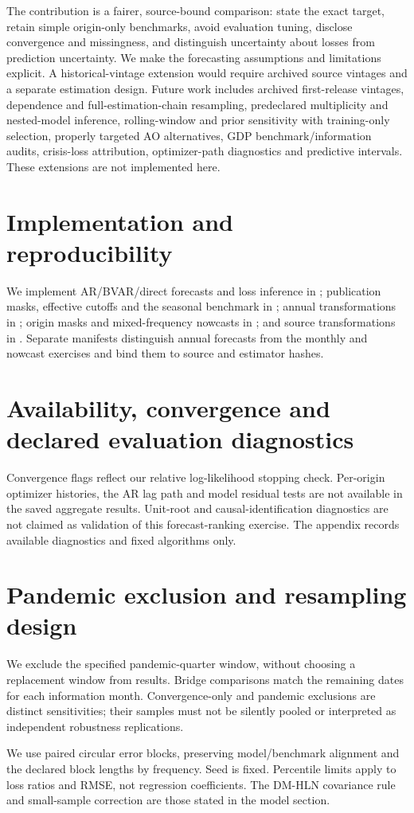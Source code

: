 The contribution is a fairer, source-bound comparison: state the exact target, retain simple origin-only benchmarks, avoid evaluation tuning, disclose convergence and missingness, and distinguish uncertainty about losses from prediction uncertainty. We make the forecasting assumptions and limitations explicit. A historical-vintage extension would require archived source vintages and a separate estimation design.
Future work includes archived first-release vintages, dependence and full-estimation-chain resampling, predeclared multiplicity and nested-model inference, rolling-window and prior sensitivity with training-only selection, properly targeted AO alternatives, GDP benchmark/information audits, crisis-loss attribution, optimizer-path diagnostics and predictive intervals. These extensions are not implemented here.

\clearpage
\appendix
\begingroup\small
\section{Implementation and reproducibility}
We implement AR/BVAR/direct forecasts and loss inference in ; publication masks, effective cutoffs and the seasonal benchmark in ; annual transformations in ; origin masks and mixed-frequency nowcasts in ; and source transformations in . Separate manifests distinguish annual forecasts from the monthly and nowcast exercises and bind them to source and estimator hashes.

\section{Availability, convergence and declared evaluation diagnostics}


Convergence flags reflect our relative log-likelihood stopping check. Per-origin optimizer histories, the AR lag path and model residual tests are not available in the saved aggregate results. Unit-root and causal-identification diagnostics are not claimed as validation of this forecast-ranking exercise. The appendix records available diagnostics and fixed algorithms only.
\section{Pandemic exclusion and resampling design}
We exclude the specified pandemic-quarter window, without choosing a replacement window from results. Bridge comparisons match the remaining dates for each information month. Convergence-only and pandemic exclusions are distinct sensitivities; their samples must not be silently pooled or interpreted as independent robustness replications.

We use paired circular error blocks, preserving model/benchmark alignment and the declared block lengths by frequency. Seed \Seed{} is fixed. Percentile limits apply to loss ratios and RMSE, not regression coefficients. The DM-HLN covariance rule and small-sample correction are those stated in the model section.
\endgroup
